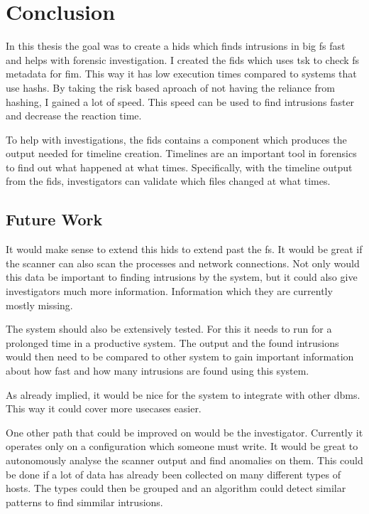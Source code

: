 
\chapter{Conclusion}
\label{sec:Conclusion}

In this thesis the goal was to create a \gls{hids} which finds intrusions in big \gls{fs} fast and helps with forensic investigation. I created the \gls{fids} which uses \gls{tsk} to check \gls{fs} \gls{metadata} for \gls{fim}. This way it has low execution times compared to systems that use \glspl{hash}. By taking the risk based aproach of not having the reliance from hashing, I gained a lot of speed. This speed can be used to find intrusions faster and decrease the reaction time. 

To help with investigations, the \gls{fids} contains a component which produces the output needed for timeline creation. Timelines are an important tool in forensics to find out what happened at what times. Specifically, with the timeline output from the \gls{fids}, investigators can validate which files changed at what times. 

\section{Future Work}
\label{sec:future:work}

It would make sense to extend this \gls{hids} to extend past the \gls{fs}. It would be great if the scanner can also scan the processes and network connections. Not only would this data be important to finding intrusions by the system, but it could also give investigators much more information. Information which they are currently mostly missing.

The system should also be extensively tested. For this it needs to run for a prolonged time in a productive system. The output and the found intrusions would then need to be compared to other system to gain important information about how fast and how many intrusions are found using this system. 

As already implied, it would be nice for the system to integrate with other \gls{dbms}. This way it could cover more usecases easier. 

One other path that could be improved on would be the investigator. Currently it operates only on a configuration which someone must write. It would be great to autonomously analyse the scanner output and find anomalies on them. This could be done if a lot of data has already been collected on many different types of hosts. The types could then be grouped and an algorithm could detect similar patterns to find simmilar intrusions. 
